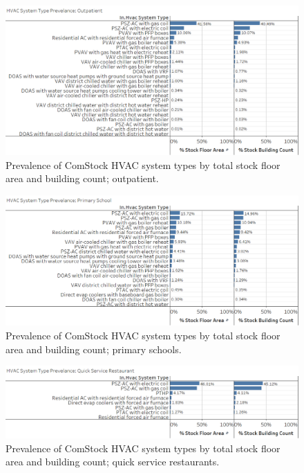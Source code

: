 \begin{figure}
    \centering \includegraphics[width=1.0\textwidth]{figures/HVAC_SYS_Type_PREV_Outpatient.png}
    \caption[HVAC system type prevalence in outpatient]{Prevalence of ComStock HVAC system types by total stock floor area and building count; outpatient.}
    \label{fig:hvac_sys_type_prevalence_outpatient}
\end{figure}

\begin{figure}
    \centering \includegraphics[width=1.0\textwidth]{figures/HVAC_SYS_Type_PREV_Primary_School.png}
    \caption[HVAC system type prevalence in primary schools]{Prevalence of ComStock HVAC system types by total stock floor area and building count; primary schools.}
    \label{fig:hvac_sys_type_prevalence_primary_school}
\end{figure}

\begin{figure}
    \centering \includegraphics[width=1.0\textwidth]{figures/HVAC_SYS_Type_PREV_QSR.png}
    \caption[HVAC system type prevalence in quick service restaurants]{Prevalence of ComStock HVAC system types by total stock floor area and building count; quick service restaurants.}
    \label{fig:hvac_sys_type_prevalence_qsr}
\end{figure}

